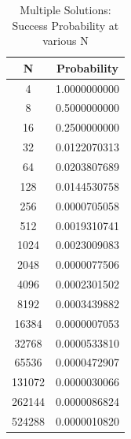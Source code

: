\documentclass[12pt, oneside]{book}
\theoremstyle{definition}
\theoremstyle{definition}
\theoremstyle{remark}
\begin{document}
\begin{table}[H]
    \centering
    \begin{tabular}{c|c}
    N & Probability \\
    \hline
        4	& 1.0000000000 \\
        8	& 0.5000000000 \\
        16	& 0.2500000000 \\
        32	& 0.0122070313 \\
        64	& 0.0203807689 \\
        128	& 0.0144530758 \\
        256	& 0.0000705058 \\
        512	& 0.0019310741 \\
        1024	& 0.0023009083 \\
        2048	& 0.0000077506 \\
        4096	& 0.0002301502 \\
        8192	& 0.0003439882 \\
        16384	& 0.0000007053 \\
        32768	& 0.0000533810 \\
        65536	& 0.0000472907 \\
        131072	& 0.0000030066 \\
        262144	& 0.0000086824 \\
        524288	& 0.0000010820 \\ 
    \end{tabular}
    \caption{Multiple Solutions: Success Probability at various N}
    \label{tab:multiple_solns}
\end{table}
\end{document}
